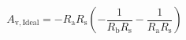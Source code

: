 \begin{equation}
A_{\mathrm{v},\mathrm{Ideal}} = - R_{\mathrm{a}} R_{\mathrm{s}} \left(- \frac{1}{R_{\mathrm{b}} R_{\mathrm{s}}} - \frac{1}{R_{\mathrm{a}} R_{\mathrm{s}}}\right)
\end{equation}

